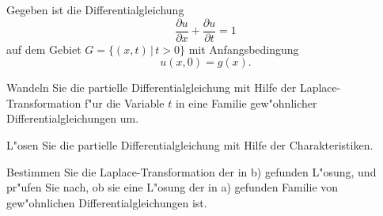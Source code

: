 Gegeben ist die Differentialgleichung
\[
\frac{\partial u}{\partial x}+\frac{\partial u}{\partial t}=1
\]
auf dem Gebiet $G=\{ (x,t)\,|\,t>0\}$ mit Anfangsbedingung
\[
u(x,0)=g(x).
\]
\begin{teilaufgaben}
\item
Wandeln Sie die partielle Differentialgleichung mit Hilfe der
Laplace-Transformation f"ur die Variable $t$ in eine Familie
gew"ohnlicher Differentialgleichungen um.
\item
L"osen Sie die partielle Differentialgleichung mit Hilfe der Charakteristiken.
\item 
Bestimmen Sie die Laplace-Transformation der in b) gefunden L"osung, und
pr"ufen Sie nach, ob sie eine L"osung der in a) gefunden Familie von
gew"ohnlichen Differentialgleichungen ist.
\end{teilaufgaben}

